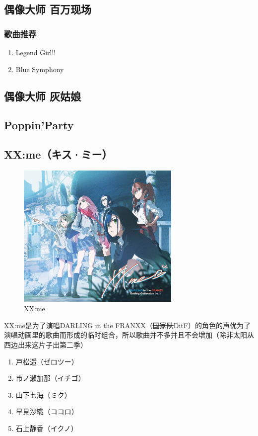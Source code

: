 \documentclass{ctexart}
\begin{document}
\subsection{偶像大师 百万现场}
\subsubsection*{歌曲推荐}
\begin{enumerate}
\item Legend Girl!!
\item Blue Symphony
\end{enumerate}

\subsection{偶像大师 灰姑娘}

\subsection{Poppin'Party}


\subsection{XX:me（キス·ミー）}
\begin{figure}[h]
\centering
 \includegraphics[width=0.7\textwidth]{xx_me.jpg}
 \caption{XX:me}
\end{figure}
XX:me是为了演唱DARLING in the FRANXX（\sout{国家队}DitF）的角色的声优为了演唱动画里的歌曲而形成的临时组合，所以歌曲并不多并且不会增加（除非太阳从西边出来这片子出第二季）
\begin{enumerate}
\item  戸松遥（ゼロツー） 
\item  市ノ瀬加那（イチゴ）
\item  山下七海（ミク）
\item  早見沙織（ココロ）
\item  石上静香（イクノ）
\end{enumerate}
\end{document}
